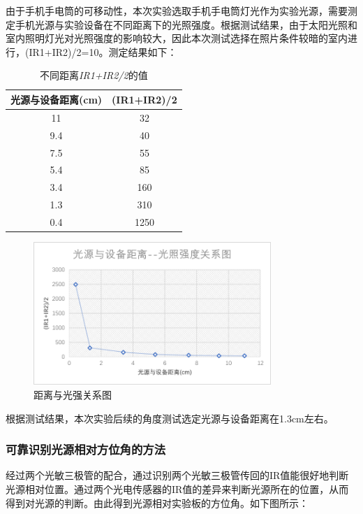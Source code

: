 \par{由于手机手电筒的可移动性，本次实验选取手机手电筒灯光作为实验光源，需要测定手机光源与实验设备在不同距离下的光照强度。根据测试结果，由于太阳光照和室内照明灯光对光照强度的影响较大，因此本次测试选择在照片条件较暗的室内进行，(IR1+IR2)/2=10。测定结果如下：}

\begin{table}[h]
	\centering
	\begin{tabular}{|c|c|}
        \hline
        光源与设备距离(cm)&(IR1+IR2)/2\\
        \hline
        11&32\\
        9.4&40\\
        7.5&55\\
        5.4&85\\
        3.4&160\\
        1.3&310\\
        0.4&1250\\
        \hline
	\end{tabular}
	\caption{不同距离\emph{IR1+IR2/2}的值}
	\label{tab:1.2}
\end{table}

\begin{figure}[H]
\centering
\includegraphics[width=9cm]{figure/1.3.3.png}
\caption{距离与光强关系图} \label{fig:1.3.3}
\end{figure}

\par{根据测试结果，本次实验后续的角度测试选定光源与设备距离在1.3cm左右。}

\subsubsection{可靠识别光源相对方位角的方法}
\par{经过两个光敏三极管的配合，通过识别两个光敏三极管传回的IR值能很好地判断光源相对位置。通过两个光电传感器的IR值的差异来判断光源所在的位置，从而得到对光源的判断。由此得到光源相对实验板的方位角。如下图所示：}


